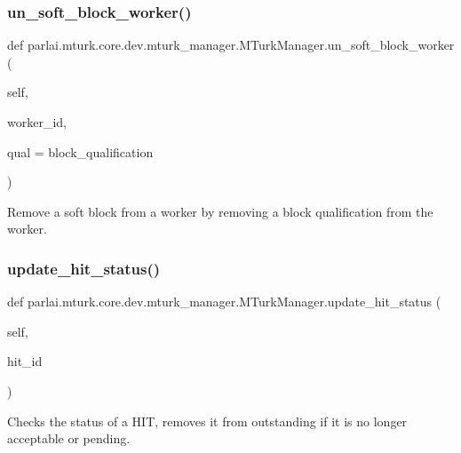 \subsubsection{\texorpdfstring{un\+\_\+soft\+\_\+block\+\_\+worker()}{un\_soft\_block\_worker()}}
{\footnotesize\ttfamily def parlai.\+mturk.\+core.\+dev.\+mturk\+\_\+manager.\+M\+Turk\+Manager.\+un\+\_\+soft\+\_\+block\+\_\+worker (\begin{DoxyParamCaption}\item[{}]{self,  }\item[{}]{worker\+\_\+id,  }\item[{}]{qual = {\ttfamily \textquotesingle{}block\+\_\+qualification\textquotesingle{}} }\end{DoxyParamCaption})}

\begin{DoxyVerb}Remove a soft block from a worker by removing a block qualification from the
worker.
\end{DoxyVerb}
 \mbox{\label{classparlai_1_1mturk_1_1core_1_1dev_1_1mturk__manager_1_1MTurkManager_a1dcb973dba5c4261e8f9d7ba004ae2f2}} 
\subsubsection{\texorpdfstring{update\+\_\+hit\+\_\+status()}{update\_hit\_status()}}
{\footnotesize\ttfamily def parlai.\+mturk.\+core.\+dev.\+mturk\+\_\+manager.\+M\+Turk\+Manager.\+update\+\_\+hit\+\_\+status (\begin{DoxyParamCaption}\item[{}]{self,  }\item[{}]{hit\+\_\+id }\end{DoxyParamCaption})}

\begin{DoxyVerb}Checks the status of a HIT, removes it from outstanding if it is no longer
acceptable or pending.
\end{DoxyVerb}
 

